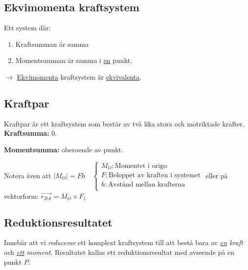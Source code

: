 \documentclass{article}
\newenvironment{ankiflashcard}[1][ ]{}{}
\begin{document}
\begin{paracol}{2}
\begin{ankiflashcard}
\subsection{Ekvimomenta kraftsystem}
Ett system där:
\begin{enumerate}
    \item Kraftsumman är samma
    \item Momentsumman är samma i \underline{en} punkt.
\end{enumerate}
$\rightarrow$ \underline{Ekvimomenta} kraftsystem är \underline{ekvivalenta}.
\end{ankiflashcard}

\begin{ankiflashcard}
    
\subsection{Kraftpar}
Kraftpar är ett kraftsystem som består av två lika stora och motriktade krafter.
\textbf{Kraftsumma:} $0$.


\textbf{Momentsumma:} oberoende av punkt.


Notera även att $\left\lvert M_O \right\rvert = Fh\quad\left\{\begin{array}{l}M_O: \text{Momentet i origo} \\F: \text{Beloppet av kraften i systemet} \\h: \text{Avstånd mellan krafterna} \\\end{array}\right.$
eller på vektorform: $\vec{r_{BA}} = M_O \times F_1$
\end{ankiflashcard}

\begin{ankiflashcard}
\subsection{Reduktionsresultatet}
Innebär att vi \textit{reducerar} ett komplext kraftsystem till att bestå bara av \textit{\underline{en} kraft} och \textit{\underline{ett} moment}. Resultatet kallas ett reduktionsresultat med avseende på en punkt $P$.


\end{ankiflashcard}
\end{paracol}
\end{document}
